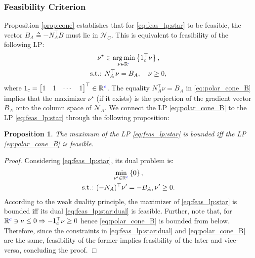 \documentclass[letterpaper, 10 pt, conference]{ieeeconf}  %
\newtheorem{proposition}{\textbf{Proposition}}
\begin{document}
\subsubsection{\textbf{Feasibility Criterion}}
Proposition \ref{prop:cone} establishes that for \eqref{eq:feas_lp:star} to be feasible, the vector $B_A \triangleq -N_A^\top B $ must lie in $\mathcal{N}_C$. This is equivalent to feasibility of the following LP:
\begin{equation}\label{eq:polar_cone_B}
    \begin{gathered}
    \nu^\star \in \underset{\nu\in\mathbb{R}{\color{blue}^c}}{\arg\min}\left\{{1}^\top_c \nu \right\}, \\
    \textrm{s.t.: } N_A^\top \nu = B_A , \quad  \nu \geq 0,
    \end{gathered}    
\end{equation}
where ${1}_c = \begin{bmatrix}1 & 1 &\cdots&1\end{bmatrix}^\top\in\mathbb{R}{\color{blue}^c}$. The equality $ N_A^\top \nu = B_A$ in \eqref{eq:polar_cone_B} implies that the maximizer $\nu^\star$ (if it exists) is the projection of the gradient vector $B_A$ onto the column space of $\mathcal{N}_A$. We connect the LP \eqref{eq:polar_cone_B} to the LP \eqref{eq:feas_lp:star} through the following proposition:
\begin{proposition}\label{prop:lp_cone_feas}
    The maximum of the LP \eqref{eq:feas_lp:star} is bounded iff the LP \eqref{eq:polar_cone_B} is feasible. 
\end{proposition}
\begin{proof}
    Considering \eqref{eq:feas_lp:star}, its dual problem is:
\begin{equation}\label{eq:feas_lp:star:dual}
    \begin{gathered}
        \underset{\nu'\in\mathbb{R}{\color{blue}^c}}{\min}
        \left\{
            0 
        \right\},        \\
        \textrm{s.t.: } (-N_A)^\top \nu'= -B_A, \nu' \geq 0.
    \end{gathered}
\end{equation}
According to the weak duality principle, the maximizer of \eqref{eq:feas_lp:star} is bounded iff its dual \eqref{eq:feas_lp:star:dual} is feasible. Further, note that, for $\mathbb{R}{\color{blue}^c} \ni \nu \leq 0 \Rightarrow -{1}_c^\top\nu \geq 0 $ hence \eqref{eq:polar_cone_B} is bounded from below. Therefore, since the constraints in \eqref{eq:feas_lp:star:dual} and \eqref{eq:polar_cone_B} are the same, feasibility of the former implies feasibility of the later and vice-versa, concluding the proof.  
\end{proof}
\end{document}
